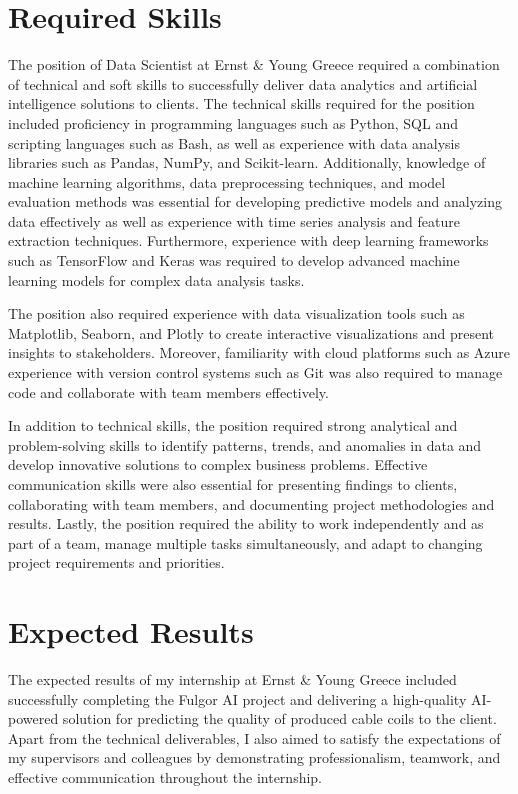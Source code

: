\section{Required Skills}

The position of Data Scientist at Ernst \& Young Greece required a combination
of technical and soft skills to successfully deliver data analytics and
artificial intelligence solutions to clients. The technical skills required for
the position included proficiency in programming languages such as Python, SQL
and scripting languages such as Bash, as well as experience with data analysis
libraries such as Pandas, NumPy, and Scikit-learn. Additionally, knowledge of
machine learning algorithms, data preprocessing techniques, and model
evaluation methods was essential for developing predictive models and analyzing
data effectively as well as experience with time series analysis and feature
extraction techniques. Furthermore, experience with deep learning frameworks
such as TensorFlow and Keras was required to develop advanced machine learning
models for complex data analysis tasks.

The position also required experience with data visualization tools such as
Matplotlib, Seaborn, and Plotly to create interactive visualizations and
present insights to stakeholders. Moreover, familiarity with cloud platforms
such as Azure experience with version control systems such as Git was also
required to manage code and collaborate with team members effectively.

In addition to technical skills, the position required strong analytical and
problem-solving skills to identify patterns, trends, and anomalies in data and
develop innovative solutions to complex business problems. Effective
communication skills were also essential for presenting findings to clients,
collaborating with team members, and documenting project methodologies and
results. Lastly, the position required the ability to work independently
and as part of a team, manage multiple tasks simultaneously, and adapt to
changing project requirements and priorities.



\section{Expected Results}

The expected results of my internship at Ernst \& Young Greece included
successfully completing the Fulgor AI project and delivering a high-quality
AI-powered solution for predicting the quality of produced cable coils to the
client. Apart from the technical deliverables, I also aimed to satisfy the
expectations of my supervisors and colleagues by demonstrating professionalism,
teamwork, and effective communication throughout the internship.